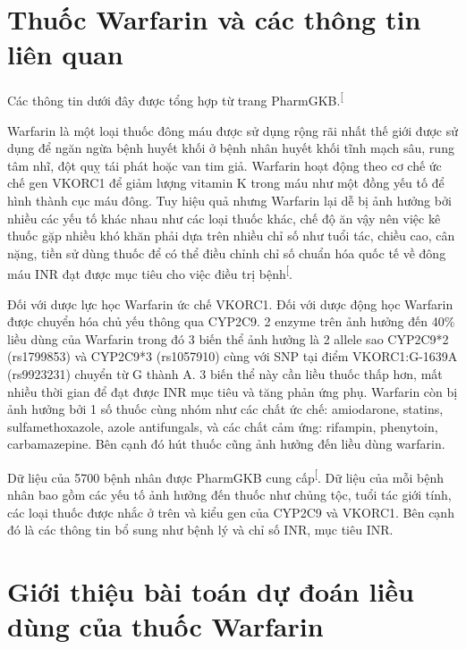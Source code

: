 \documentclass[14pt,oneside]{scrbook}
\begin{document}
\section{Thuốc Warfarin và các thông tin liên
quan}\label{thuux1ed1c-warfarin-vuxe0-cuxe1c-thuxf4ng-tin-liuxean-quan}

Các thông tin dưới đây được tổng hợp từ trang
PharmGKB.\textsuperscript{{[}\citeproc{ref-warfarin1}{1}{]}}

Warfarin là một loại thuốc đông máu được sử dụng rộng rãi nhất thế giới
được sử dụng để ngăn ngừa bệnh huyết khối ở bệnh nhân huyết khối tĩnh
mạch sâu, rung tâm nhĩ, đột quỵ tái phát hoặc van tim giả. Warfarin hoạt
động theo cơ chế ức chế gen VKORC1 để giảm lượng vitamin K trong máu như
một đồng yếu tố để hình thành cục máu đông. Tuy hiệu quả nhưng Warfarin
lại dễ bị ảnh hưởng bởi nhiều các yếu tố khác nhau như các loại thuốc
khác, chế độ ăn vậy nên việc kê thuốc gặp nhiều khó khăn phải dựa trên
nhiều chỉ số như tuổi tác, chiều cao, cân nặng, tiền sử dùng thuốc để có
thể điều chỉnh chỉ số chuẩn hóa quốc tế về đông máu INR đạt được mục
tiêu cho việc điều trị
bệnh\textsuperscript{{[}\citeproc{ref-inr}{5}{]}}.

Đối với dược lực học Warfarin ức chế VKORC1. Đối với dược động học
Warfarin được chuyển hóa chủ yếu thông qua CYP2C9. 2 enzyme trên ảnh
hưởng đến 40\% liều dùng của Warfarin trong đó 3 biến thể ảnh hưởng là 2
allele sao CYP2C9*2 (rs1799853) và CYP2C9*3 (rs1057910) cùng với SNP tại
điểm VKORC1:G-1639A (rs9923231) chuyển từ G thành A. 3 biến thể này cần
liều thuốc thấp hơn, mất nhiều thời gian để đạt được INR mục tiêu và
tăng phản ứng phụ. Warfarin còn bị ảnh hưởng bởi 1 số thuốc cùng nhóm
như các chất ức chế: amiodarone, statins, sulfamethoxazole, azole
antifungals, và các chất cảm ứng: rifampin, phenytoin, carbamazepine.
Bên cạnh đó hút thuốc cũng ảnh hưởng đến liều dùng warfarin.

Dữ liệu của 5700 bệnh nhân được PharmGKB cung
cấp\textsuperscript{{[}\citeproc{ref-warfarin-data}{6}{]}}. Dữ liệu của mỗi bệnh nhân bao gồm các yếu tố ảnh hưởng đến thuốc như chủng tộc, tuổi tác giới tính, các loại thuốc được nhắc ở trên và kiểu gen của CYP2C9 và VKORC1. Bên cạnh đó là các thông tin bổ sung như
bệnh lý và chỉ số INR, mục tiêu INR.

\section{Giới thiệu bài toán dự đoán liều dùng của thuốc
Warfarin}\label{sec:1.3}
\end{document}
